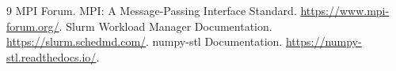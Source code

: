 \documentclass[14pt]{extarticle}
\begin{document}
\begin{thebibliography}{9}
 MPI Forum. MPI: A Message-Passing Interface Standard. \url{https://www.mpi-forum.org/}.
 Slurm Workload Manager Documentation. \url{https://slurm.schedmd.com/}.
 numpy-stl Documentation. \url{https://numpy-stl.readthedocs.io/}.
\end{thebibliography}
\end{document}
